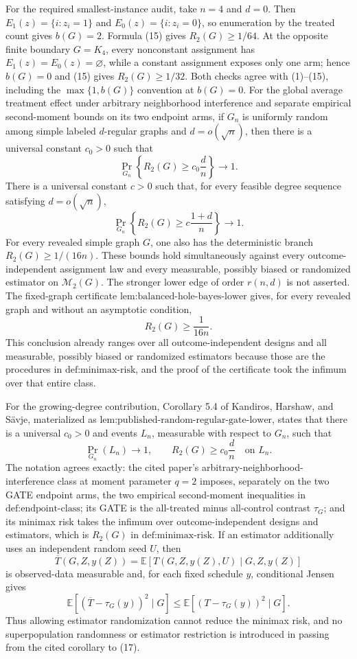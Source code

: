 For the required smallest-instance audit, take \(n=4\) and \(d=0\).  Then \(E_1(z)=\{i:z_i=1\}\) and \(E_0(z)=\{i:z_i=0\}\), so enumeration by the treated count gives \(b(G)=2\).  Formula (15) gives \(R_2(G)\ge1/64\).  At the opposite finite boundary \(G=K_4\), every nonconstant assignment has \(E_1(z)=E_0(z)=\varnothing\), while a constant assignment exposes only one arm; hence \(b(G)=0\) and (15) gives \(R_2(G)\ge1/32\).  Both checks agree with (1)--(15), including the \(\max\{1,b(G)\}\) convention at \(b(G)=0\).
For the global average treatment effect under arbitrary neighborhood interference and separate empirical second-moment bounds on its two endpoint arms, if \(G_n\) is uniformly random among simple labeled \(d\)-regular graphs and \(d=o(\sqrt n)\), then there is a universal constant \(c_0>0\) such that
\[
\Pr_{G_n}\!\left\{R_2(G)\ge c_0\frac d n\right\}\longrightarrow1.
\]
There is a universal constant \(c>0\) such that, for every feasible degree sequence satisfying \(d=o(\sqrt n)\),
\[
\Pr_{G_n}\!\left\{R_2(G)\ge c\frac{1+d}{n}\right\}\longrightarrow1.
\]
For every revealed simple graph \(G\), one also has the deterministic branch \(R_2(G)\ge1/(16n)\).  These bounds hold simultaneously against every outcome-independent assignment law and every measurable, possibly biased or randomized estimator on \(\mathcal M_2(G)\).  The stronger lower edge of order \(r(n,d)\) is not asserted.
The fixed-graph certificate \(\text{lem:balanced-hole-bayes-lower}\) gives, for every revealed graph and without an asymptotic condition,
\[
R_2(G)\ge\frac1{16n}. \tag{16}
\]
This conclusion already ranges over all outcome-independent designs and all measurable, possibly biased or randomized estimators because those are the procedures in \(\text{def:minimax-risk}\), and the proof of the certificate took the infimum over that entire class.

For the growing-degree contribution, Corollary 5.4 of Kandiros, Harshaw, and S\"avje, materialized as \(\text{lem:published-random-regular-gate-lower}\), states that there is a universal \(c_0>0\) and events \(L_n\), measurable with respect to \(G_n\), such that
\[
\Pr_{G_n}(L_n)\longrightarrow1,
\qquad
R_2(G)\ge c_0\frac d n\quad\text{on }L_n. \tag{17}
\]
The notation agrees exactly: the cited paper's arbitrary-neighborhood-interference class at moment parameter \(q=2\) imposes, separately on the two GATE endpoint arms, the two empirical second-moment inequalities in \(\text{def:endpoint-class}\); its GATE is the all-treated minus all-control contrast \(\tau_G\); and its minimax risk takes the infimum over outcome-independent designs and estimators, which is \(R_2(G)\) in \(\text{def:minimax-risk}\).  If an estimator additionally uses an independent random seed \(U\), then
\[
\overline T(G,Z,y(Z))
=\mathbb E[T(G,Z,y(Z),U)\mid G,Z,y(Z)]
\]
is observed-data measurable and, for each fixed schedule \(y\), conditional Jensen gives
\[
\mathbb E[(\overline T-\tau_G(y))^2\mid G]
\le
\mathbb E[(T-\tau_G(y))^2\mid G].
\]
Thus allowing estimator randomization cannot reduce the minimax risk, and no superpopulation randomness or estimator restriction is introduced in passing from the cited corollary to (17).


